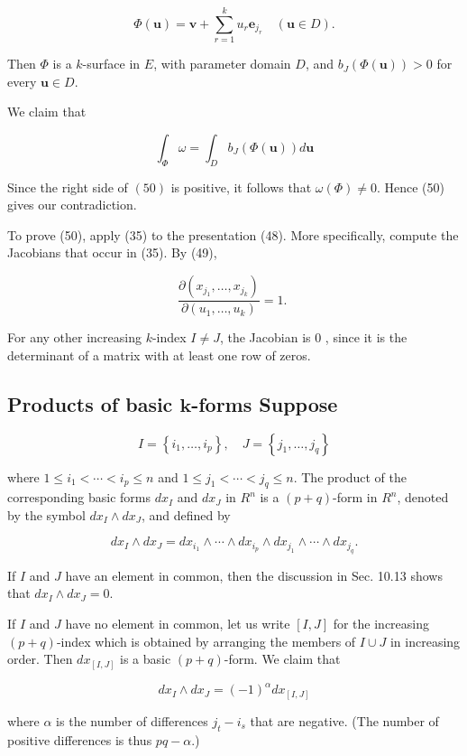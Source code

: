 \documentclass[10pt]{article}
\begin{document}
$$
\Phi(\mathbf{u})=\mathbf{v}+\sum_{r=1}^{k} u_{r} \mathbf{e}_{j_{r}} \quad(\mathbf{u} \in D) .
$$

Then $\Phi$ is a $k$-surface in $E$, with parameter domain $D$, and $b_{J}(\Phi(\mathbf{u}))>0$ for every $\mathbf{u} \in D$.

We claim that

$$
\int_{\Phi} \omega=\int_{D} b_{J}(\Phi(\mathbf{u})) d \mathbf{u}
$$

Since the right side of $(50)$ is positive, it follows that $\omega(\Phi) \neq 0$. Hence (50) gives our contradiction.

To prove (50), apply (35) to the presentation (48). More specifically, compute the Jacobians that occur in (35). By (49),

$$
\frac{\partial\left(x_{j_{1}}, \ldots, x_{j_{k}}\right)}{\partial\left(u_{1}, \ldots, u_{k}\right)}=1 \text {. }
$$

For any other increasing $k$-index $I \neq J$, the Jacobian is 0 , since it is the determinant of a matrix with at least one row of zeros.

\subsection{Products of basic $\boldsymbol{k}$-forms Suppose}
$$
I=\left\{i_{1}, \ldots, i_{p}\right\}, \quad J=\left\{j_{1}, \ldots, j_{q}\right\}
$$

where $1 \leq i_{1}<\cdots<i_{p} \leq n$ and $1 \leq j_{1}<\cdots<j_{q} \leq n$. The product of the corresponding basic forms $d x_{I}$ and $d x_{J}$ in $R^{n}$ is a $(p+q)$-form in $R^{n}$, denoted by the symbol $d x_{I} \wedge d x_{J}$, and defined by

$$
d x_{I} \wedge d x_{J}=d x_{i_{1}} \wedge \cdots \wedge d x_{i_{p}} \wedge d x_{j_{1}} \wedge \cdots \wedge d x_{j_{q}} .
$$

If $I$ and $J$ have an element in common, then the discussion in Sec. 10.13 shows that $d x_{I} \wedge d x_{J}=0$.

If $I$ and $J$ have no element in common, let us write $[I, J]$ for the increasing $(p+q)$-index which is obtained by arranging the members of $I \cup J$ in increasing order. Then $d x_{[I, J]}$ is a basic $(p+q)$-form. We claim that

$$
d x_{I} \wedge d x_{J}=(-1)^{\alpha} d x_{[I, J]}
$$

where $\alpha$ is the number of differences $j_{t}-i_{s}$ that are negative. (The number of positive differences is thus $p q-\alpha$.)
\end{document}

